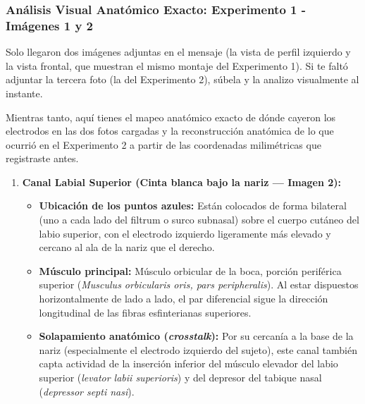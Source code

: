 \documentclass[11pt,a4paper]{article}
\begin{document}
\subsubsection{Análisis Visual Anatómico Exacto: Experimento 1 - Imágenes 1 y 2}
Solo llegaron dos imágenes adjuntas en el mensaje (la vista de perfil izquierdo y la vista frontal, que muestran el mismo montaje del Experimento 1). Si te faltó adjuntar la tercera foto (la del Experimento 2), súbela y la analizo visualmente al instante.

Mientras tanto, aquí tienes el mapeo anatómico exacto de dónde cayeron los electrodos en las dos fotos cargadas y la reconstrucción anatómica de lo que ocurrió en el Experimento 2 a partir de las coordenadas milimétricas que registraste antes.

\begin{enumerate}
    \item \textbf{Canal Labial Superior (Cinta blanca bajo la nariz — Imagen 2):}
    \begin{itemize}
        \item \textbf{Ubicación de los puntos azules:} Están colocados de forma bilateral (uno a cada lado del filtrum o surco subnasal) sobre el cuerpo cutáneo del labio superior, con el electrodo izquierdo ligeramente más elevado y cercano al ala de la nariz que el derecho.
        \item \textbf{Músculo principal:} Músculo orbicular de la boca, porción periférica superior (\textit{Musculus orbicularis oris, pars peripheralis}). Al estar dispuestos horizontalmente de lado a lado, el par diferencial sigue la dirección longitudinal de las fibras esfinterianas superiores.
        \item \textbf{Solapamiento anatómico (\textit{crosstalk}):} Por su cercanía a la base de la nariz (especialmente el electrodo izquierdo del sujeto), este canal también capta actividad de la inserción inferior del músculo elevador del labio superior (\textit{levator labii superioris}) y del depresor del tabique nasal (\textit{depressor septi nasi}).
    \end{itemize}


\end{enumerate}
\end{document}
